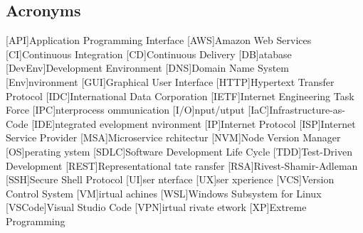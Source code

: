 \newcommand{\abbr}{Abbreviations}
\subsection{Acronyms}

\begin{acronym}[1234567890]		%
\setlength{\itemsep}{-\parsep}	%

[API]{Application Programming Interface}
[AWS]{Amazon Web Services}
[CI]{Continuous Integration}
[CD]{Continuous Delivery}
[DB]{atabase}
[DevEnv]{Development Environment}
[DNS]{Domain Name System}
[Env]{nvironment}
[GUI]{Graphical User Interface}
[HTTP]{Hypertext Transfer Protocol}
[IDC]{International Data Corporation}
[IETF]{Internet Engineering Task Force}
[IPC]{nterprocess ommunication}
[I/O]{nput/utput}
[IaC]{Infrastructure-as-Code}
[IDE]{ntegrated evelopment nvironment}
[IP]{Internet Protocol}
[ISP]{Internet Service Provider}
[MSA]{Microservice rchitectur}
[NVM]{Node Version Manager}
[OS]{perating ystem}
[SDLC]{Software Development Life Cycle}
[TDD]{Test-Driven Development}
[REST]{Representational tate ransfer}
[RSA]{Rivest-Shamir-Adleman}
[SSH]{Secure Shell Protocol}
[UI]{ser nterface}
[UX]{ser xperience}
[VCS]{Version Control System}
[VM]{irtual achines}
[WSL]{Windows Subsystem for Linux}
[VSCode]{Visual Studio Code}
[VPN]{irtual rivate etwork}
[XP]{Extreme Programming}
\end{acronym}

